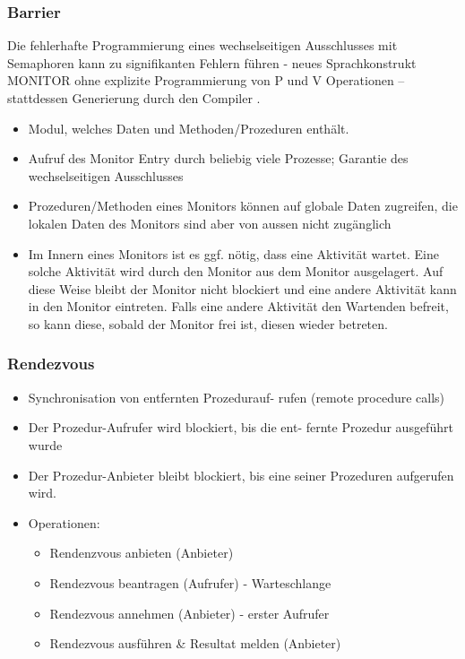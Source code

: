 \documentclass[a4paper, 10pt]{article}
\begin{document}
\subsubsection{Barrier}
Die fehlerhafte Programmierung eines wechselseitigen Ausschlusses mit Semaphoren kann zu signifikanten Fehlern f\"uhren - neues Sprachkonstrukt MONITOR ohne explizite Programmierung von P und V Operationen – stattdessen Generierung durch den Compiler .
\begin{itemize}
	\item Modul, welches Daten und Methoden/Prozeduren enth\"alt.
	\item Aufruf des Monitor Entry durch beliebig viele Prozesse; Garantie des wechselseitigen Ausschlusses
	\item Prozeduren/Methoden eines Monitors können auf globale Daten zugreifen, die lokalen Daten des Monitors sind aber von aussen nicht zug\"anglich
	\item Im Innern eines Monitors ist es ggf. nötig, dass eine Aktivit\"at wartet. Eine solche Aktivit\"at wird durch den Monitor aus dem Monitor ausgelagert. Auf diese Weise bleibt der Monitor nicht blockiert und eine andere Aktivit\"at kann in den Monitor eintreten. Falls eine andere Aktivit\"at den Wartenden befreit, so kann diese, sobald der Monitor frei ist, diesen wieder betreten.	
\end{itemize}

\subsubsection{Rendezvous}
\begin{itemize}
	\item Synchronisation von entfernten Prozedurauf- rufen (remote procedure calls)
	\item Der Prozedur-Aufrufer wird blockiert, bis die ent- fernte Prozedur ausgef\"uhrt wurde
	\item Der Prozedur-Anbieter bleibt blockiert, bis eine seiner Prozeduren aufgerufen wird.
	\item Operationen:
		\begin{itemize}
			\item Rendenzvous anbieten (Anbieter)
			\item Rendezvous beantragen (Aufrufer) - Warteschlange
			\item Rendezvous annehmen (Anbieter) - erster Aufrufer
			\item Rendezvous ausf\"uhren \& Resultat melden (Anbieter)
		\end{itemize}
\end{itemize}
\end{document}
